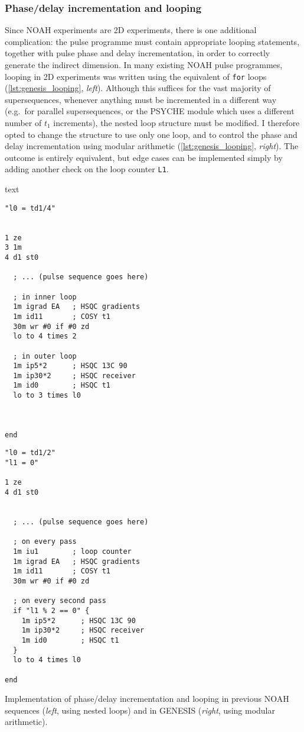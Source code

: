 \subsubsection{Phase/delay incrementation and looping}

Since NOAH experiments are 2D experiments, there is one additional complication: the pulse programme must contain appropriate looping statements, together with pulse phase and delay incrementation, in order to correctly generate the indirect dimension.
In many existing NOAH pulse programmes, looping in 2D experiments was written using the equivalent of \texttt{for} loops (\cref{lst:genesis_looping}, \textit{left}).
Although this suffices for the vast majority of supersequences, whenever anything must be incremented in a different way (e.g.\ for parallel supersequences, or the PSYCHE module which uses a different number of $t_1$ increments), the nested loop structure must be modified.
I therefore opted to change the structure to use only one loop, and to control the phase and delay incrementation using modular arithmetic (\cref{lst:genesis_looping}, \textit{right}).
The outcome is entirely equivalent, but edge cases can be implemented simply by adding another check on the loop counter \texttt{L1}.

\begin{mylisting}[!ht] %
\begin{tcbmintedsbs}{text}
\begin{verbatim}
"l0 = td1/4"


1 ze
3 1m
4 d1 st0

  ; ... (pulse sequence goes here)

  ; in inner loop
  1m igrad EA   ; HSQC gradients
  1m id11       ; COSY t1
  30m wr #0 if #0 zd
  lo to 4 times 2

  ; in outer loop
  1m ip5*2      ; HSQC 13C 90
  1m ip30*2     ; HSQC receiver
  1m id0        ; HSQC t1
  lo to 3 times l0



end
\end{verbatim}
\tcblower
\begin{verbatim}
"l0 = td1/2"
"l1 = 0"

1 ze
4 d1 st0


  ; ... (pulse sequence goes here)

  ; on every pass
  1m iu1        ; loop counter
  1m igrad EA   ; HSQC gradients
  1m id11       ; COSY t1
  30m wr #0 if #0 zd

  ; on every second pass
  if "l1 % 2 == 0" {
    1m ip5*2      ; HSQC 13C 90
    1m ip30*2     ; HSQC receiver
    1m id0        ; HSQC t1
  }
  lo to 4 times l0

end
\end{verbatim}
\end{tcbmintedsbs}
    \caption[GENESIS implementation of looping]{Implementation of phase/delay incrementation and looping in previous NOAH sequences (\textit{left}, using nested loops) and in GENESIS (\textit{right}, using modular arithmetic).}
    \label{lst:genesis_looping}
\end{mylisting} %



